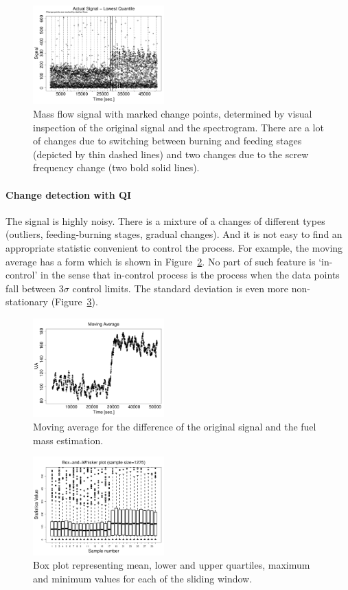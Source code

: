 \begin{figure}[htb!]
\includegraphics[width=0.45\textwidth]{pics/cfb_paper/OMF/OMFscalednoise}
\caption{Mass flow signal with marked change points, determined by visual inspection of the original signal and the spectrogram.
There are a lot of changes due to switching between burning and feeding stages (depicted by thin dashed lines) and
two changes due to the screw frequency change (two bold solid lines).}
\label{figure18}
\end{figure}

\paragraph{Change detection with QI}
The signal is highly noisy.
There is a mixture of a changes of different types (outliers, feeding-burning stages, gradual changes).
And it is not easy to find an appropriate statistic convenient to control the process.
For example, the moving average has a form which is shown in Figure~\ref{figure19}.
No part of such feature is `in-control' in the sense that in-control process is the process
when the data points fall between $3\sigma$ control limits.
The standard deviation is even more non-stationary (Figure~\ref{figure20}).

\begin{figure}[htb!]
\includegraphics[width=0.45\textwidth]{pics/cfb_paper/OMF/OMFrma}
\caption{Moving average for the difference of the original signal and the fuel mass estimation.}\label{figure19}
\end{figure}
\begin{figure}[htb!]
\includegraphics[width=0.45\textwidth]{pics/cfb_paper/OMF/OMFboxplot}
\caption{Box plot representing mean, lower and upper quartiles, maximum and minimum values for each of the sliding window.}\label{figure20}
\end{figure}

